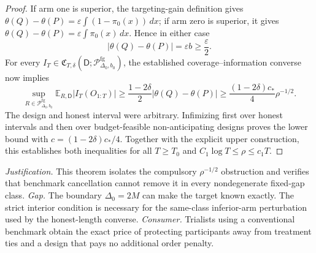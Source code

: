 \documentclass{article}
\begin{document}
\begin{proof}
If arm one is superior, the targeting-gain definition gives
\(\theta(Q)-\theta(P)=\varepsilon
\int(1-\pi_0(x))\,dx\); if arm zero is superior, it gives
\(\theta(Q)-\theta(P)=\varepsilon\int\pi_0(x)\,dx\).  Hence in either case
\[
 |\theta(Q)-\theta(P)|=\varepsilon b\geq\frac\varepsilon2.
\]
For every
\(I_T\in\mathfrak C_{T,\delta}(\mathsf D;
\mathcal P_{\Delta_0,b_0}^{\mathrm{fg}})\), the established
coverage--information converse now implies
\[
 \sup_{R\in\mathcal P_{\Delta_0,b_0}^{\mathrm{fg}}}
 \mathbb E_{R,\mathsf D}|I_T(O_{1:T})|
 \geq
 \frac{1-2\delta}{2}|\theta(Q)-\theta(P)|
 \geq\frac{(1-2\delta)c_*}{4}\rho^{-1/2}.
\]
The design and honest interval were arbitrary.  Infimizing first over honest
intervals and then over budget-feasible non-anticipating designs proves the
lower bound with \(c=(1-2\delta)c_*/4\).  Together with the explicit upper
construction, this establishes both inequalities for all \(T\geq T_0\) and
\(C_1\log T\leq\rho\leq c_1T\).
\end{proof}
\par\smallskip\noindent \textit{Justification.} This theorem isolates the compulsory \(\rho^{-1/2}\) obstruction and verifies that benchmark cancellation cannot remove it in every nondegenerate fixed-gap class. \textit{Gap.} The boundary \(\Delta_0=2M\) can make the target known exactly. The strict interior condition is necessary for the same-class inferior-arm perturbation used by the honest-length converse. \textit{Consumer.} Trialists using a conventional benchmark obtain the exact price of protecting participants away from treatment ties and a design that pays no additional order penalty.
\end{document}
